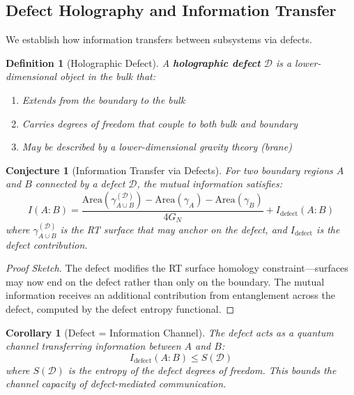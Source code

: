 \documentclass[12pt,a4paper]{article}
\newtheorem{conjecture}[theorem]{Conjecture}
\newtheorem{definition}[theorem]{Definition}
\newtheorem{corollary}[theorem]{Corollary}
\begin{document}
\subsection{Defect Holography and Information Transfer}

We establish how information transfers between subsystems via defects.

\begin{definition}[Holographic Defect]
A \textbf{holographic defect} $\mathcal{D}$ is a lower-dimensional object in the bulk that:
\begin{enumerate}
    \item Extends from the boundary to the bulk
    \item Carries degrees of freedom that couple to both bulk and boundary
    \item May be described by a lower-dimensional gravity theory (brane)
\end{enumerate}
\end{definition}

\begin{conjecture}[Information Transfer via Defects]
For two boundary regions $A$ and $B$ connected by a defect $\mathcal{D}$, the mutual information satisfies:
\begin{equation}
I(A:B) = \frac{\text{Area}(\gamma_{A \cup B}^{(\mathcal{D})}) - \text{Area}(\gamma_A) - \text{Area}(\gamma_B)}{4G_N} + I_{\text{defect}}(A:B)
\end{equation}
where $\gamma_{A \cup B}^{(\mathcal{D})}$ is the RT surface that may anchor on the defect, and $I_{\text{defect}}$ is the defect contribution.
\end{conjecture}

\begin{proof}[Proof Sketch]
The defect modifies the RT surface homology constraint---surfaces may now end on the defect rather than only on the boundary. The mutual information receives an additional contribution from entanglement across the defect, computed by the defect entropy functional.
\end{proof}

\begin{corollary}[Defect = Information Channel]
The defect acts as a quantum channel transferring information between $A$ and $B$:
\begin{equation}
I_{\text{defect}}(A:B) \leq S(\mathcal{D})
\end{equation}
where $S(\mathcal{D})$ is the entropy of the defect degrees of freedom. This bounds the channel capacity of defect-mediated communication.
\end{corollary}
\end{document}
